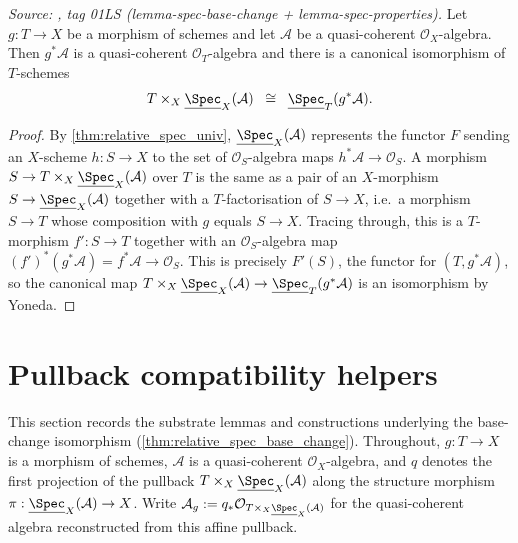 \begin{theorem}
  \label{thm:relative_spec_base_change}
  \textit{Source: \cite{stacks-project}, tag 01LS (lemma-spec-base-change +
  lemma-spec-properties).}
  Let \(g : T \to X\) be a morphism of schemes and let \(\mathcal{A}\) be a quasi-coherent
  \(\mathcal{O}_X\)-algebra. Then \(g^* \mathcal{A}\) is a quasi-coherent
  \(\mathcal{O}_T\)-algebra and there is a canonical isomorphism of \(T\)-schemes
  \[
    T \times_X \underline{\Spec}_X(\mathcal{A}) \;\;\cong\;\;
    \underline{\Spec}_T(g^* \mathcal{A}).
  \]
\end{theorem}

\begin{proof}
  By \cref{thm:relative_spec_univ}, \(\underline{\Spec}_X(\mathcal{A})\) represents
  the functor \(F\) sending an \(X\)-scheme \(h : S \to X\) to the set of
  \(\mathcal{O}_S\)-algebra maps \(h^*\mathcal{A} \to \mathcal{O}_S\). A morphism
  \(S \to T \times_X \underline{\Spec}_X(\mathcal{A})\) over \(T\) is the same as a pair of an
  \(X\)-morphism \(S \to \underline{\Spec}_X(\mathcal{A})\) together with a \(T\)-factorisation
  of \(S \to X\), i.e.\ a morphism \(S \to T\) whose composition with \(g\) equals
  \(S \to X\). Tracing through, this is a \(T\)-morphism \(f' : S \to T\) together with an
  \(\mathcal{O}_S\)-algebra map \((f')^*(g^*\mathcal{A}) = f^*\mathcal{A} \to \mathcal{O}_S\).
  This is precisely \(F'(S)\), the functor for \((T, g^*\mathcal{A})\), so the canonical map
  \(T \times_X \underline{\Spec}_X(\mathcal{A}) \to \underline{\Spec}_T(g^*\mathcal{A})\)
  is an isomorphism by Yoneda.
\end{proof}

\section{Pullback compatibility helpers}
\label{sec:relspec_pullback_helpers}

This section records the substrate lemmas and constructions underlying the
base-change isomorphism (\cref{thm:relative_spec_base_change}). Throughout,
\(g : T \to X\) is a morphism of schemes, \(\mathcal{A}\) is a quasi-coherent
\(\mathcal{O}_X\)-algebra, and \(q\) denotes the first projection of the pullback
\(T \times_X \underline{\Spec}_X(\mathcal{A})\) along the structure morphism
\(\pi : \underline{\Spec}_X(\mathcal{A}) \to X\). Write
\(\mathcal{A}_g := q_* \mathcal{O}_{T \times_X \underline{\Spec}_X(\mathcal{A})}\)
for the quasi-coherent algebra reconstructed from this affine pullback.

